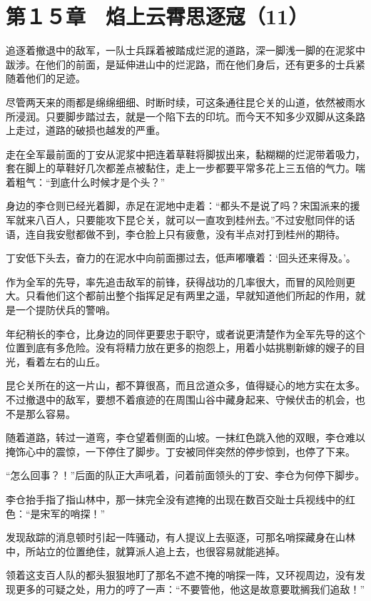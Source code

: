 \section{第１５章　焰上云霄思逐寇（11）}

追逐着撤退中的敌军，一队士兵踩着被踏成烂泥的道路，深一脚浅一脚的在泥浆中跋涉。在他们的前面，是延伸进山中的烂泥路，而在他们身后，还有更多的士兵紧随着他们的足迹。

尽管两天来的雨都是绵绵细细、时断时续，可这条通往昆仑关的山道，依然被雨水所浸润。只要脚步踏过去，就是一个陷下去的印坑。而今天不知多少双脚从这条路上走过，道路的破损也越发的严重。

走在全军最前面的丁安从泥浆中把连着草鞋将脚拔出来，黏糊糊的烂泥带着吸力，套在脚上的草鞋好几次都差点被黏住，走上一步都要平常多花上三五倍的气力。喘着粗气：“到底什么时候才是个头？”

身边的李仓则已经光着脚，赤足在泥地中走着：“都头不是说了吗？宋国派来的援军就来八百人，只要能攻下昆仑关，就可以一直攻到桂州去。”不过安慰同伴的话语，连自我安慰都做不到，李仓脸上只有疲惫，没有半点对打到桂州的期待。

丁安低下头去，奋力的在泥水中向前面挪过去，低声嘟囔着：‘回头还来得及。’。

作为全军的先导，率先追击敌军的前锋，获得战功的几率很大，而冒的风险则更大。只看他们这个都前出整个指挥足足有两里之遥，早就知道他们所起的作用，就是一个提防伏兵的警哨。

年纪稍长的李仓，比身边的同伴更要忠于职守，或者说更清楚作为全军先导的这个位置到底有多危险。没有将精力放在更多的抱怨上，用着小姑挑剔新嫁的嫂子的目光，看着左右的山丘。

昆仑关所在的这一片山，都不算很髙，而且岔道众多，值得疑心的地方实在太多。不过撤退中的敌军，要想不着痕迹的在周围山谷中藏身起来、守候伏击的机会，也不是那么容易。

随着道路，转过一道弯，李仓望着侧面的山坡。一抹红色跳入他的双眼，李仓难以掩饰心中的震惊，一下停住了脚步。丁安被同伴突然的停步惊到，也停了下来。

“怎么回事？！”后面的队正大声吼着，问着前面领头的丁安、李仓为何停下脚步。

李仓抬手指了指山林中，那一抹完全没有遮掩的出现在数百交趾士兵视线中的红色：“是宋军的哨探！”

发现敌踪的消息顿时引起一阵骚动，有人提议上去驱逐，可那名哨探藏身在山林中，所站立的位置绝佳，就算派人追上去，也很容易就能逃掉。

领着这支百人队的都头狠狠地盯了那名不遮不掩的哨探一阵，又环视周边，没有发现更多的可疑之处，用力的哼了一声：“不要管他，他这是故意要耽搁我们追敌！”

